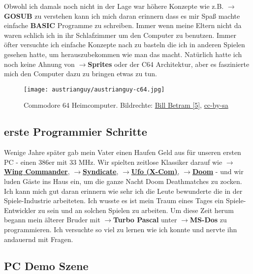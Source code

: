 Obwohl ich damals noch nicht in der Lage war höhere Konzepte wie z.B. \textbf{$\rightarrow$GOSUB} zu verstehen kann ich mich daran erinnern dass es mir Spaß machte einfache \textbf{BASIC} Programme zu schreiben. Immer wenn meine Eltern nicht da waren schlich ich in ihr Schlafzimmer um den Computer zu benutzen. Immer öfter versuchte ich einfache Konzepte nach zu basteln die ich in anderen Spielen gesehen hatte, um herauszubekommen wie man das macht. Natürlich hatte ich noch keine Ahnung von \textbf{$\rightarrow$Sprites} oder der C64 Architektur, aber es faszinierte mich den Computer dazu zu bringen etwas zu tun.

\begin{figure}
\texttt{[image: austrianguy/austrianguy-c64.jpg]}\\
\caption{Commodore 64 Heimcomputer. Bildrechte: \href{https://commons.wikimedia.org/wiki/File:Commodore64.jpg}{Bill Betram [5]}, \href{https://creativecommons.org/licenses/by-sa/2.5/deed.en}{cc-by-sa}}
\end{figure}

\subsection*{erste Programmier Schritte}

Wenige Jahre später gab mein Vater einen Haufen Geld aus für unseren ersten PC - einen 386er mit 33 MHz. Wir spielten zeitlose Klassiker darauf wie \href{https://de.wikipedia.org/wiki/Wing_Commander_(Computerspiel)}{\textbf{$\rightarrow$Wing Commander}}, \href{https://de.wikipedia.org/wiki/Syndicate}{\textbf{$\rightarrow$Syndicate}}, \href{https://de.wikipedia.org/wiki/X-COM}{\textbf{$\rightarrow$Ufo (X-Com)}}, \href{https://de.wikipedia.org/wiki/Doom}{\textbf{$\rightarrow$Doom}} - und wir luden Gäste ins Haus ein, um die ganze Nacht Doom Deathmatches zu zocken. Ich kann mich gut daran erinnern wie sehr ich die Leute bewunderte die in der Spiele-Industrie arbeiteten. Ich wusste es ist mein Traum eines Tages ein Spiele-Entwickler zu sein und an solchen Spielen zu arbeiten. Um diese Zeit herum begann mein älterer Bruder mit \textbf{$\rightarrow$Turbo Pascal} unter \textbf{$\rightarrow$MS-Dos} zu programmieren. Ich versuchte so viel zu lernen wie ich konnte und nervte ihn andauernd mit Fragen.

\subsection*{PC Demo Szene}

